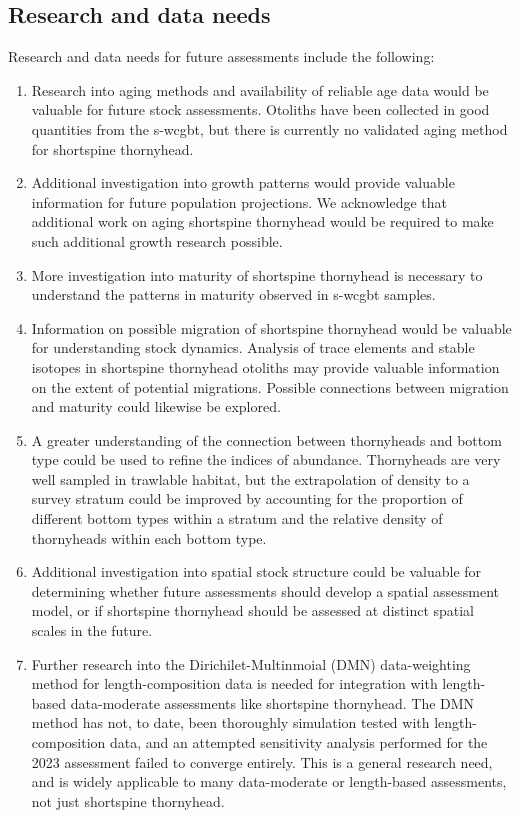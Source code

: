 \documentclass[11pt,
  english,
  letterpaper,
]{article}
\providecommand{\tightlist}{%
  \setlength{\itemsep}{0pt}\setlength{\parskip}{0pt}}
\providecommand{\tightlist}{%
  \setlength{\itemsep}{0pt}\setlength{\parskip}{0pt}}
\begin{document}
\hypertarget{research-and-data-needs}{%
\subsection*{Research and data needs}\label{research-and-data-needs}}

Research and data needs for future assessments include the following:

\begin{enumerate}
\def\labelenumi{\arabic{enumi}.}
\tightlist
\item
  Research into aging methods and availability of reliable age data would be valuable for future stock assessments. Otoliths have been collected in good quantities from the \gls{s-wcgbt}, but there is currently no validated aging method for shortspine thornyhead.
\item
  Additional investigation into growth patterns would provide valuable information for future population projections. We acknowledge that additional work on aging shortspine thornyhead would be required to make such additional growth research possible.
\item
  More investigation into maturity of shortspine thornyhead is necessary to understand the patterns in maturity observed in \gls{s-wcgbt} samples.
\item
  Information on possible migration of shortspine thornyhead would be valuable for understanding stock dynamics. Analysis of trace elements and stable isotopes in shortspine thornyhead otoliths may provide valuable information on the extent of potential migrations. Possible connections between migration and maturity could likewise be explored.
\item
  A greater understanding of the connection between thornyheads and bottom type could be used to refine the indices of abundance. Thornyheads are very well sampled in trawlable habitat, but the extrapolation of density to a survey stratum could be improved by accounting for the proportion of different bottom types within a stratum and the relative density of thornyheads within each bottom type.
\item
  Additional investigation into spatial stock structure could be valuable for determining whether future assessments should develop a spatial assessment model, or if shortspine thornyhead should be assessed at distinct spatial scales in the future.
\item
  Further research into the Dirichilet-Multinmoial (DMN) data-weighting method for length-composition data is needed for integration with length-based data-moderate assessments like shortspine thornyhead. The DMN method has not, to date, been thoroughly simulation tested with length-composition data, and an attempted sensitivity analysis performed for the 2023 assessment failed to converge entirely. This is a general research need, and is widely applicable to many data-moderate or length-based assessments, not just shortspine thornyhead.
\end{enumerate}
\end{document}
